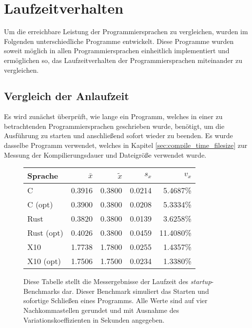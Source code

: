 \section{Laufzeitverhalten}

Um die erreichbare Leistung der Programmiersprachen zu vergleichen,
wurden im Folgenden unterschiedliche Programme entwickelt.
Diese Programme wurden soweit möglich in allen Programmiersprachen einheitlich implementiert und ermöglichen so,
das Laufzeitverhalten der Programmiersprachen miteinander zu vergleichen.

\subsection{Vergleich der Anlaufzeit}

Es wird zunächst überprüft, wie lange ein Programm,
welches in einer zu betrachtenden Programmiersprachen geschrieben wurde,
benötigt, um die Ausführung zu starten und anschließend sofort wieder zu beenden.
Es wurde dasselbe Programm verwendet, welches in Kapitel \ref{sec:compile_time_filesize} zur Messung
der Kompilierungsdauer und Dateigröße verwendet wurde.

\begin{figure}[hb]
	\begin{center}
		\begin{tabular}{lrrrr}
			\toprule
			Sprache    & $\bar{x}$ & $\tilde{x}$ & $s_x$ & $v_x$ \\
			\midrule
			C          & 0.3916 & 0.3800 & 0.0214 &  5.4687\% \\
			C (opt)    & 0.3900 & 0.3800 & 0.0208 &  5.3334\% \\
			Rust       & 0.3820 & 0.3800 & 0.0139 &  3.6258\% \\
			Rust (opt) & 0.4026 & 0.3800 & 0.0459 & 11.4080\% \\
			X10        & 1.7738 & 1.7800 & 0.0255 &  1.4357\% \\
			X10 (opt)  & 1.7506 & 1.7500 & 0.0234 &  1.3380\% \\
			\bottomrule
		\end{tabular}
	\end{center}
	\caption{
		Diese Tabelle stellt die Messergebnisse der Laufzeit des \textit{startup}-Benchmarks dar.
		Dieser Benchmark simuliert das Starten und sofortige Schließen eines Programms.
		Alle Werte sind auf vier Nachkommastellen gerundet und mit Ausnahme des Variationskoeffizienten
		in Sekunden angegeben.
	}
	\label{fig:startup_table}
\end{figure}

